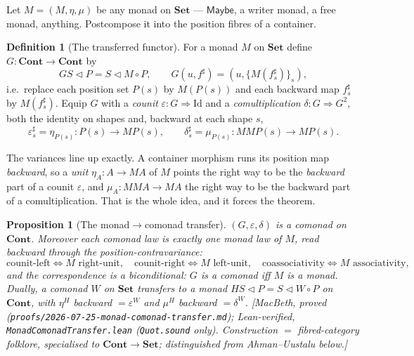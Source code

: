 \documentclass[11pt,a4paper]{book}
\newcommand{\Set}{\mathbf{Set}}
\newcommand{\Cont}{\mathbf{Cont}}
\newcommand{\cont}[2]{#1 \triangleleft #2}
\theoremstyle{plain}
\newtheorem{Proposition}[Theorem]{Proposition}
\theoremstyle{definition}
\newtheorem{Definition}[Theorem]{Definition}
\theoremstyle{remark}
\newcommand{\prov}[1]{\hfill\textsf{\footnotesize[#1]}}
\begin{document}
Let $M=(M,\eta,\mu)$ be any monad on $\Set$ --- $\mathsf{Maybe}$, a writer monad, a free monad,
anything. Postcompose it into the position fibres of a container.

\begin{Definition}[The transferred functor]\label{def:transfer-G}
For a monad $M$ on $\Set$ define $G\colon\Cont\to\Cont$ by
\[
  G\cont SP=\cont S{M\circ P},\qquad G(u,f^{\sharp})=(u,\{M(f^{\sharp}_{s})\}_{s}),
\]
i.e.\ replace each position set $P(s)$ by $M(P(s))$ and each backward map $f^{\sharp}_{s}$ by
$M(f^{\sharp}_{s})$. Equip $G$ with a \emph{counit} $\varepsilon\colon G\Rightarrow\mathrm{Id}$
and a \emph{comultiplication} $\delta\colon G\Rightarrow G^{2}$, both the identity on shapes and,
backward at each shape $s$,
\[
  \varepsilon^{\sharp}_{s}=\eta_{P(s)}\colon P(s)\to M P(s),
  \qquad
  \delta^{\sharp}_{s}=\mu_{P(s)}\colon MMP(s)\to MP(s).
\]
\end{Definition}

The variances line up exactly. A container morphism runs its position map \emph{backward}, so a
\emph{unit} $\eta_{A}\colon A\to MA$ of $M$ points the right way to be the \emph{backward} part of
a counit $\varepsilon$, and $\mu_{A}\colon MMA\to MA$ the right way to be the backward part of a
comultiplication. That is the whole idea, and it forces the theorem.

\begin{Proposition}[The monad$\to$comonad transfer]\label{prop:transfer}
$(G,\varepsilon,\delta)$ is a comonad on $\Cont$. Moreover each comonad law is \emph{exactly}
one monad law of $M$, read backward through the position-contravariance:
\[
  \text{counit-left}\Leftrightarrow M\text{ right-unit},\quad
  \text{counit-right}\Leftrightarrow M\text{ left-unit},\quad
  \text{coassociativity}\Leftrightarrow M\text{ associativity},
\]
and the correspondence is a biconditional: $G$ is a comonad iff $M$ is a monad. Dually, a
\emph{comonad} $W$ on $\Set$ transfers to a \emph{monad} $H\cont SP=\cont S{W\circ P}$ on $\Cont$,
with $\eta^{H}$ backward $=\varepsilon^{W}$ and $\mu^{H}$ backward $=\delta^{W}$.
\prov{MacBeth, proved (\texttt{proofs/2026-07-25-monad-comonad-transfer.md}); Lean-verified,
\texttt{MonadComonadTransfer.lean} (\texttt{Quot.sound} only). Construction $=$ fibred-category
folklore, specialised to $\Cont\to\Set$; distinguished from Ahman--Uustalu below.}
\end{Proposition}
\end{document}

